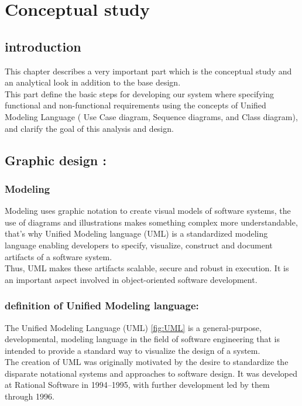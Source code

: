 \chapter{Conceptual study}

\section{introduction}
This chapter describes a very important part which is the conceptual study and an analytical look in addition to the base design.\\
This part define the basic steps for developing our system where specifying functional and non-functional requirements using the concepts of Unified Modeling Language ( Use Case diagram, Sequence diagrams, and Class diagram), and clarify the goal of
this analysis and design.

\section{Graphic design :}

\subsection{Modeling}
Modeling uses graphic notation to create visual models of software systems, the use of diagrams and illustrations makes something
complex more understandable, that's why Unified Modeling language (UML) \cite{Techopedia-UML} is a standardized modeling language enabling developers to specify, visualize, construct and document artifacts of a software system.\\
Thus, UML makes these artifacts scalable, secure and robust in execution. It is an important aspect involved in object-oriented software development.

\subsection{definition of Unified Modeling language:}
The Unified Modeling Language (UML) \ref{fig:UML} is a general-purpose, developmental, modeling language in the field of software engineering that is intended to provide a standard way to visualize the design of a system.\\

The creation of UML was originally motivated by the desire to standardize the disparate notational systems and approaches to software design. It was developed at Rational Software in 1994–1995, with further development led by them through 1996.\\

